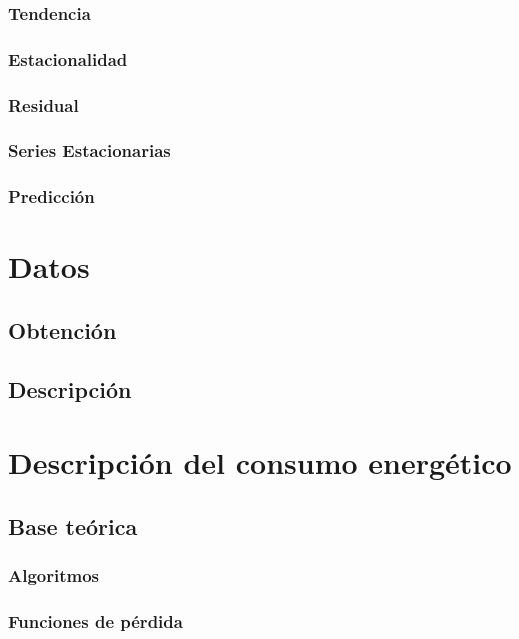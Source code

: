 \documentclass[a4paper,12pt]{article}
\begin{document}
\subsubsection{Tendencia}

\subsubsection{Estacionalidad}

\subsubsection{Residual}

\subsubsection{Series Estacionarias}

\subsubsection{Predicción}


\section{Datos}

\subsection{Obtención}

\subsection{Descripción}

\section{Descripción del consumo energético}

\subsection{Base teórica}

\subsubsection{Algoritmos}

\subsubsection{Funciones de pérdida}
\end{document}
